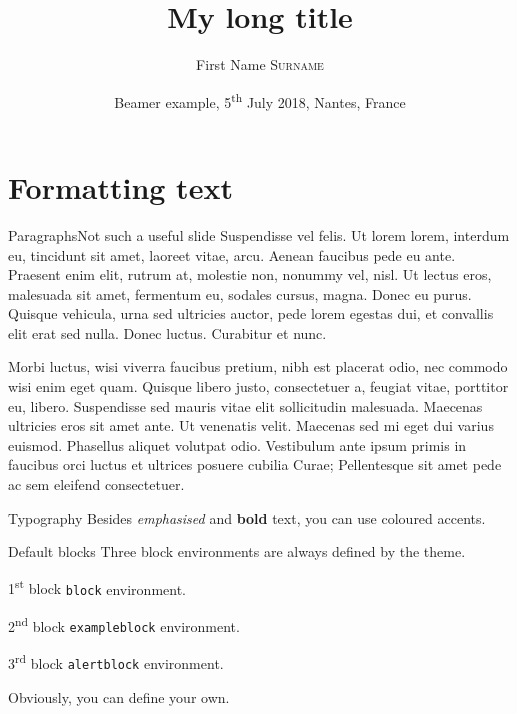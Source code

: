 \documentclass[aspectratio=169%
]{beamer}
\title[My short title]{My long title}
\author[F.\,N. Surname ]{First Name \textsc{Surname}}
\institute[Short affiliation]{My long affiliation}
\date[2018-07-05]{Beamer example, 5\textsuperscript{th} July 2018, Nantes, France}
\begin{document}
\maketitle{}



\section{Formatting text}

\begin{frame}{Paragraphs}{Not such a useful slide}
  Suspendisse vel felis. Ut lorem lorem, interdum eu, tincidunt sit amet, laoreet
  vitae, arcu. Aenean faucibus pede eu ante. Praesent enim elit, rutrum at, molestie
  non, nonummy vel, nisl. Ut lectus eros, malesuada sit amet, fermentum eu,
  sodales cursus, magna. Donec eu purus. Quisque vehicula, urna sed ultricies
  auctor, pede lorem egestas dui, et convallis elit erat sed nulla. Donec luctus.
  Curabitur et nunc. 

  Morbi luctus, wisi viverra faucibus pretium, nibh est placerat odio, nec commodo
  wisi enim eget quam. Quisque libero justo, consectetuer a, feugiat vitae, porttitor
  eu, libero. Suspendisse sed mauris vitae elit sollicitudin malesuada. Maecenas
  ultricies eros sit amet ante. Ut venenatis velit. Maecenas sed mi eget dui varius
  euismod. Phasellus aliquet volutpat odio. Vestibulum ante ipsum primis in
  faucibus orci luctus et ultrices posuere cubilia Curae; Pellentesque sit amet pede
  ac sem eleifend consectetuer. 
\end{frame}

\begin{frame}{Typography}
  Besides \emph{emphasised} and \textbf{bold} text, you can use coloured \alert{accents}.
\end{frame}

\begin{frame}{Default blocks}
  Three block environments are always defined by the theme.
  
  \begin{block}{1\textsuperscript{st} block}
    \texttt{block} environment.
  \end{block}
  
  \begin{exampleblock}{2\textsuperscript{nd} block}
    \texttt{exampleblock} environment.
  \end{exampleblock}
  
  \begin{alertblock}{3\textsuperscript{rd} block}
    \texttt{alertblock} environment.
  \end{alertblock}

  Obviously, you can define your own.  
\end{frame}
\end{document}
